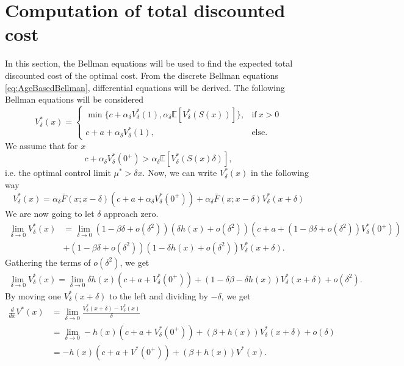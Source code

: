 \section{Computation of total discounted cost}
In this section, the Bellman equations will be used to find the expected total discounted cost of the optimal cost.
From the discrete Bellman equations \eqref{eq:AgeBasedBellman}, differential equations will be derived.
The following Bellman equations will be considered
\[V_\delta^*(x)=\begin{cases}
\min\{c+\alpha_\delta V^*_\delta(1),\alpha_\delta \mathbb{E}[V^*_\delta(S(x))]\},&\text{if}\ x>0 \\
c+a+\alpha_\delta V^*_\delta(1),&\text{else.}
\end{cases}\]
We assume that for $x$
$$
c+\alpha_\delta V^*_\delta(0^+)>\alpha_\delta \mathbb{E}[V^*_\delta(S(x)\delta)],
$$
i.e. the optimal control limit $\mu^*>\delta x$.
Now, we can write $V^*_\delta(x)$ in the following way
\[V^*_\delta(x)=\alpha_\delta \bar F(x;x-\delta) (c+a+\alpha_\delta V^*_\delta(0^+))
+\alpha_\delta \bar F(x;x-\delta)V^*_\delta(x+\delta)
\]
We are now going to let $\delta$ approach zero.
\begin{equation}
\begin{split}
\lim\limits_{\delta\rightarrow 0} V_\delta^*(x) &=
\lim\limits_{\delta\rightarrow 0}(1-\beta\delta+o(\delta^2)) (\delta h(x)+o(\delta^2))(c+a+(1-\beta\delta+o(\delta^2)) V^*_\delta(0^+))\\
&+(1-\beta\delta+o(\delta^2)) (1-\delta h(x)+o(\delta^2))V_\delta^*(x+\delta).
\end{split}
\end{equation}
Gathering the terms of $o(\delta^2)$, we get
\begin{equation}\label{eq:gatheredDelta}
\begin{split}
\lim\limits_{\delta\rightarrow 0} V_\delta^*(x) =
\lim\limits_{\delta\rightarrow 0}\delta h(x)(c+a+ V_\delta^*(0^+))+(1-\delta\beta-\delta h(x)) V_\delta^*(x+\delta)+o(\delta^2).
\end{split}
\end{equation}
By moving one $V_\delta^*(x+\delta)$ to the left and dividing by $-\delta$, we get
\begin{equation}\label{eq:AgeBasedBellmanODE}
\begin{split}
\frac{d}{dx}V^*(x)&=\lim\limits_{\delta\rightarrow 0} \frac{V_\delta^*(x+\delta)-V_\delta^*(x)}{\delta} \\
&=\lim\limits_{\delta\rightarrow 0} -h(x)(c+a+ V_\delta^*(0^+))+(\beta+ h(x)) V_\delta^*(x+\delta)+o(\delta)\\
&=-h(x)(c+a+ V^*(0^+))+(\beta+ h(x)) V^*(x).
\end{split}
\end{equation}
